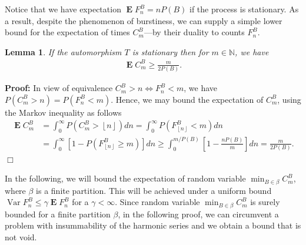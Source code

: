 \documentclass[a4paper,12pt]{article}
\newcommand{\kwad}[1]{\left[ #1 \right]}
\newcommand{\floor}[1]{\left\lfloor #1 \right\rfloor}
\DeclareMathOperator{\var}{Var}
\DeclareMathOperator{\mean}{\mathbf{E}}
\newtheorem{lemma}{Lemma}
\newenvironment*{proof}{\begin{trivlist}\item[]
\noindent\textbf{Proof:}}{$\Box$\par\end{trivlist}}
\begin{document}
Notice that we have expectation $\mean F^B_n=nP(B)$ if the process is
stationary. As a result, despite the phenomenon of burstiness, we can
supply a simple lower bound for the expectation of times $C^B_m$---by
their duality to counts $F^B_n$.
\begin{lemma}
  \label{theoUnconditional}
  If the automorphism $T$ is stationary then for $m\in\mathbb{N}$, we
  have
  \begin{align}
    \mean C^B_m
    \ge
    \frac{m}{2P(B)}.
  \end{align}
\end{lemma}
\begin{proof}
  In view of equivalence $C^B_m>n\iff F^B_n<m$, we have
  $P(C^B_m>n)=P(F^B_n<m)$.  Hence, we may bound the expectation of
  $C^B_m$, using the Markov inequality as follows
  \begin{align}
    \mean C^B_m
    &=
    \int_0^\infty P(C^B_m>\floor{n}) dn
    =
    \int_0^\infty P(F^B_{\floor{n}}<m) dn
      \nonumber\\
    &=
      \int_0^\infty \kwad{1-P(F^B_{\floor{n}}\ge m)} dn
      \ge
      \int_0^{m/P(B)} \kwad{1-\frac{nP(B)}{m}} dn
      =
      \frac{m}{2P(B)}.
  \end{align}
\end{proof}


In the following, we will bound the expectation of random variable
$\min_{B\in\beta} C^B_m$, where $\beta$ is a finite partition.  This
will be achieved under a uniform bound
$\var F^B_n\le\gamma \mean F^B_n$ for a $\gamma<\infty$.  Since random
variable $\min_{B\in\beta} C^B_m$ is surely bounded for a finite
partition $\beta$, in the following proof, we can circumvent a problem
with insummability of the harmonic series and we obtain a bound that
is not void.
\end{document}
